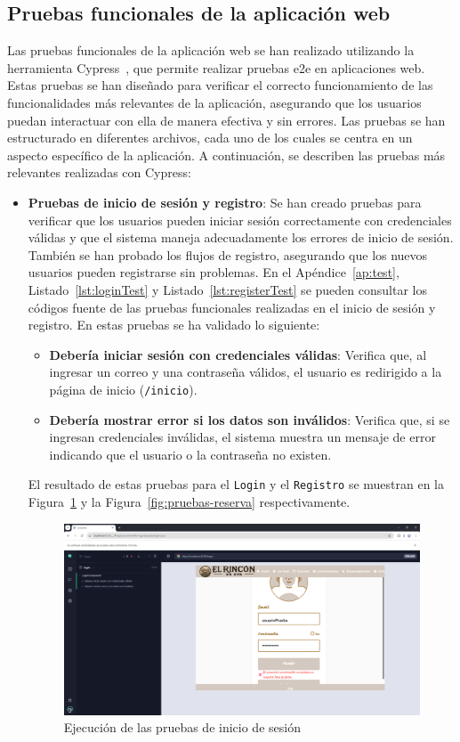     \subsection{Pruebas funcionales de la aplicación web}
Las pruebas funcionales de la aplicación web se han realizado utilizando la herramienta Cypress~\cite{cypress:web}, que permite realizar pruebas \gls{e2e} en aplicaciones web. Estas pruebas se han diseñado para verificar el correcto funcionamiento de las funcionalidades más relevantes de la aplicación, asegurando que los usuarios puedan interactuar con ella de manera efectiva y sin errores.
Las pruebas se han estructurado en diferentes archivos, cada uno de los cuales se centra en un aspecto específico de la aplicación. A continuación, se describen las pruebas más relevantes realizadas con Cypress:

\begin{itemize}
    \item \textbf{Pruebas de inicio de sesión y registro}: Se han creado pruebas para verificar que los usuarios pueden iniciar sesión correctamente con credenciales válidas y que el sistema maneja adecuadamente los errores de inicio de sesión. También se han probado los flujos de registro, asegurando que los nuevos usuarios pueden registrarse sin problemas. En el Apéndice~\ref{ap:test}, Listado~\ref{lst:loginTest} y Listado~\ref{lst:registerTest} se pueden consultar los códigos fuente de las pruebas funcionales realizadas en el inicio de sesión y registro. En estas pruebas se ha validado lo siguiente:
      \begin{itemize}
        \item \textbf{Debería iniciar sesión con credenciales válidas}: Verifica que, al ingresar un correo y una contraseña válidos, el usuario es redirigido a la página de inicio (\texttt{/inicio}).
        \item \textbf{Debería mostrar error si los datos son inválidos}: Verifica que, si se ingresan credenciales inválidas, el sistema muestra un mensaje de error indicando que el usuario o la contraseña no existen.
      \end{itemize}
      El resultado de estas pruebas para el \texttt{Login} y el \texttt{Registro} se muestran en la Figura~\ref{fig:pruebas-login} y la Figura~\ref{fig:pruebas-reserva} respectivamente.
\begin{figure}[h!tb]
\centering
\includegraphics[width=1\textwidth]{figs/pruebasLogin.png}
\caption{Ejecución de las pruebas de inicio de sesión}
\label{fig:pruebas-login}
\end{figure}


\end{itemize}
